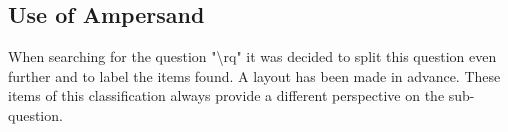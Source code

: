 \subsection{Use of Ampersand}\label{use_of_ampersand}
When searching for the question "\acrlong{\rq}" it was decided to split this question even further and to label the items found.
A layout has been made in advance.
These items of this classification always provide a different perspective on the sub-question.
\begin{comment}
When asking questions about the knowledge required in the role of software engineers to be able to use Ampersand, the focus is not only on the Ampersand method itself.
We must also ask ourselves whether, in addition to Ampersand, knowledge of the underlying theory on which Ampersand is based is also required.
Is it necessary to know relationship algebra.
The environment in which a prototype runs also plays a role.
This includes browser settings and the use of containers (Docker) in which Ampersand runs.
During development we are dealing with an \acrfull{ide}.
The use of such a \acrshort{ide} for determining the usability of Ampersand is relevant.
Internet support is now indispensable when creating the scripts.
Scripting for Ampersand also requires support for web search capabilities.
But can this be found for a relatively unknown method like Ampersand?
Finally, we look at output produced by method.
Is it true that how the method is used also determines what comes out?
This applies to both the prototype and the generated documentation.
Subsequently, the approach to this process, the use of the method, among other things, determines the result.
These aspects will be discussed in the following paragraphs.
The sub-questions can be further subdivided into small parts.
Starting from the question "\acrlong{rq1}", the question then follows which observations relate to this knowledge.
Is it knowledge about only Ampersand or is knowledge also required of relation algebra.
By working with Ampersand, we are also confronted with the environment in which we develop it.
Ampersand stands alone as a language, but in use there are development tools like \acrlong{vsc} in this case.
To run it, you need a Docker container.
That is at least the implementation as the \acrlong{ou} provides.
During the development phase, examples are searched on the internet.
And these are generally easy to find, is that also the case at Ampersand?
Ampersand also provides documentation and a prototype.
Here too, knowledge of Ampersand is required.
Finally, you also have to ask yourself whether the way Ampersand is used, the approach to the project, also requires knowledge of Ampersand.
There are a number of angles that play around Ampersand's knowledge.
\end{comment}


